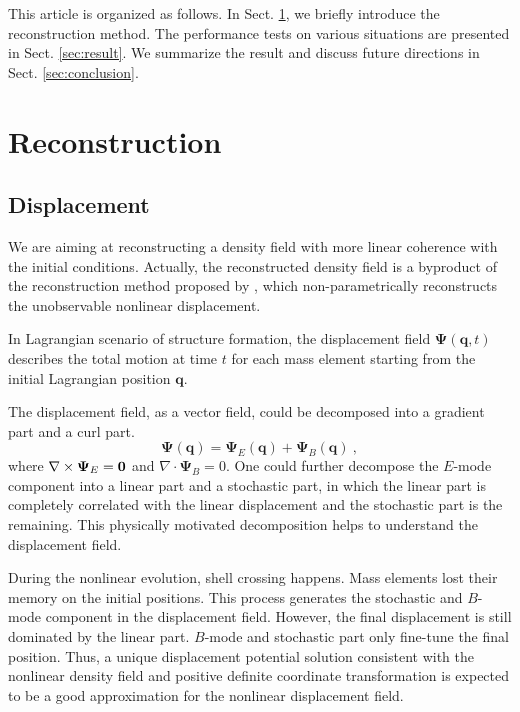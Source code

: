 \documentclass[iop]{emulateapj}
\newcommand{\be}{\begin{equation}}
\newcommand{\ee}{\end{equation}}
\newcommand{\vecq}{{\bm{q}}}
\newcommand{\vecPsi}{{\bm{\Psi}}}
\begin{document}
{This article is organized as follows.
In Sect. \ref{sec:recon}, we briefly introduce the reconstruction method.
The performance tests on various situations are presented in Sect. \ref{sec:result}.
We summarize the result and discuss future directions in Sect. \ref{sec:conclusion}.


\section{Reconstruction}
\label{sec:recon}

\subsection{Displacement}
\label{sec:ebdecom}

We are aiming at reconstructing a density field with more linear coherence with the initial conditions.
Actually, the reconstructed density field is a byproduct of the reconstruction method proposed by \cite{zhuhm16c}, which non-parametrically reconstructs the unobservable nonlinear displacement.

In Lagrangian scenario of structure formation, the displacement field $\vecPsi(\vecq,t)$ describes the total motion at time $t$ for each mass element starting from the initial Lagrangian position $\vecq$.

The displacement field, as a vector field, could be decomposed into a gradient part and a curl part.
\be
\vecPsi(\vecq)=\vecPsi_E(\vecq)+\vecPsi_B(\vecq)\ ,
\ee
where $\nabla\times\vecPsi_E=\bold{0}$ and $\nabla\cdot\vecPsi_B=0$.
One could further decompose the $E$-mode component into a linear part and a stochastic part,
in which the linear part is completely correlated with the linear displacement and the stochastic part is the remaining.  This physically motivated decomposition helps to understand the displacement field.

During the nonlinear evolution, shell crossing happens.
Mass elements lost their memory on the initial positions.
This process generates the stochastic and $B$-mode component in the displacement field.
However, the final displacement is still dominated by the linear part.
$B$-mode and stochastic part only fine-tune the final position.
Thus, a unique displacement potential solution consistent with the nonlinear density field and positive definite coordinate transformation is expected to be a good approximation for the nonlinear displacement field.

}
\end{document}
